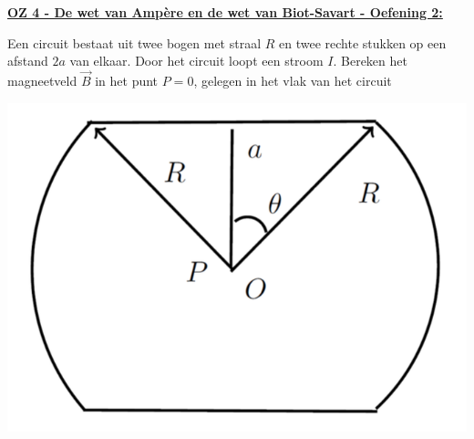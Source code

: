 \textbf{\underline{OZ 4 - De wet van Ampère en de wet van Biot-Savart - Oefening 2:}}
\vspace{0.5cm}

\begin{minipage}{0.7\textwidth}
    Een circuit bestaat uit twee bogen met straal $R$ en twee rechte stukken op een afstand $2a$ van elkaar. Door het circuit loopt een stroom $I$. Bereken het magneetveld $\vec{B}$ in het punt $P = 0$, gelegen in het vlak van het circuit
    \vspace{1.5cm}
\end{minipage}
\begin{minipage}{0.26\textwidth}
    \includegraphics[scale = 0.35]{oz04/resources/Oz4Oef2.png}
\end{minipage}

\vspace{-1.5cm}

